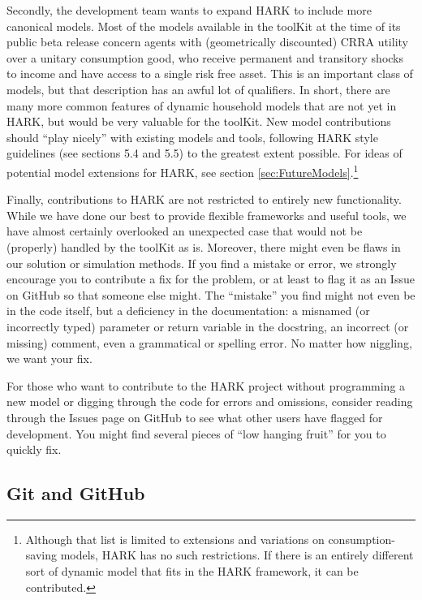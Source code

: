 \documentclass[12pt,titlepage,letterpaper]{econtex}
\begin{document}
Secondly, the development team wants to expand HARK to include more canonical models.  Most of the models available in the toolKit at the time of its public beta release concern agents with (geometrically discounted) CRRA utility over a unitary consumption good, who receive permanent and transitory shocks to income and have access to a single risk free asset.  This is an important class of models, but that description has an awful lot of qualifiers.  In short, there are many more common features of dynamic household models that are not yet in HARK, but would be very valuable for the toolKit.  New model contributions should ``play nicely'' with existing models and tools, following HARK style guidelines (see sections 5.4 and 5.5) to the greatest extent possible.  For ideas of potential model extensions for HARK, see section \ref{sec:FutureModels}.\footnote{Although that list is limited to extensions and variations on consumption-saving models, HARK has no such restrictions.  If there is an entirely different sort of dynamic model that fits in the HARK framework, it can be contributed.}

Finally, contributions to HARK are not restricted to entirely new functionality.  While we have done our best to provide flexible frameworks and useful tools, we have almost certainly overlooked an unexpected case that would not be (properly) handled by the toolKit as is.  Moreover, there might even be flaws in our solution or simulation methods.  If you find a mistake or error, we strongly encourage you to contribute a fix for the problem, or at least to flag it as an Issue on GitHub so that someone else might.  The ``mistake'' you find might not even be in the code itself, but a deficiency in the documentation: a misnamed (or incorrectly typed) parameter or return variable in the docstring, an incorrect (or missing) comment, even a grammatical or spelling error. No matter how niggling, we want your fix.

For those who want to contribute to the HARK project without programming a new model or digging through the code for errors and omissions, consider reading through the Issues page on GitHub to see what other users have flagged for development.  You might find several pieces of ``low hanging fruit'' for you to quickly fix.

\subsection{Git and GitHub}\label{sec:GitHub}
\end{document}
